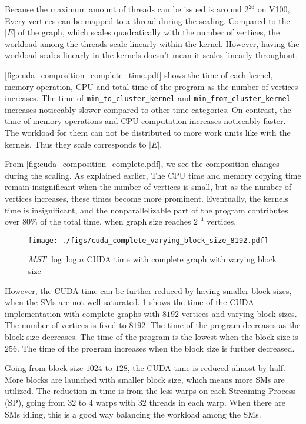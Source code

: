 \documentclass[english, 12pt, a4paper, elec, utf8, a-2b, online]{aaltothesis}
\newcommand{\mstalgo}{$MST\_\log\log{n}$}
\begin{document}
Because the maximum amount of threads can be issued is around $2^{26}$ on V100, Every vertices can be mapped to a thread during the scaling. Compared to the $|E|$ of the graph, which scales quadratically with the number of vertices, the workload among the threads scale linearly within the kernel. However, having the workload scales linearly in the kernels doesn't mean it scales linearly throughout.

\cref{fig:cuda_composition_complete_time.pdf} shows the time of each kernel, memory operation, CPU and total time of the program as the number of vertices increases. The time of \texttt{min\_to\_cluster\_kernel} and \texttt{min\_from\_cluster\_kernel} increases noticeably slower compared to other time categories. On contrast, the time of memory operations and CPU computation increases noticeably faster. The workload for them can not be distributed to more work units like with the kernels. Thus they scale corresponds to $|E|$.

From \cref{fig:cuda_composition_complete.pdf}, we see the composition changes during the scaling. As explained earlier, The CPU time and memory copying time remain insignificant when the number of vertices is small, but as the number of vertices increases, these times become more prominent. Eventually, the kernels time is insignificant, and the nonparallelizable part of the program contributes over $80\%$ of the total time, when graph size reaches $2^{14}$ vertices.


\begin{figure}[h]
	\centering
		\texttt{[image: ./figs/cuda\_complete\_varying\_block\_size\_8192.pdf]}
	\caption{\mstalgo{} CUDA time with complete graph with varying block size}
	\label{fig:cuda_complete_varying_block_size_8192.pdf}
\end{figure}

However, the CUDA time can be further reduced by having smaller block sizes, when the SMs are not well saturated. \cref{fig:cuda_complete_varying_block_size_8192.pdf} shows the time of the CUDA implementation with complete graphs with $8192$ vertices and varying block sizes. The number of vertices is fixed to $8192$. The time of the program decreases as the block size decreases. The time of the program is the lowest when the block size is $256$. The time of the program increases when the block size is further decreased.

Going from block size $1024$ to $128$, the CUDA time is reduced almost by half. More blocks are launched with smaller block size, which means more SMs are utilized. The reduction in time is from the less warps on each Streaming Process (SP), going from $32$ to $4$ warps with $32$ threads in each warp. When there are SMs idling, this is a good way balancing the workload among the SMs.
\end{document}
